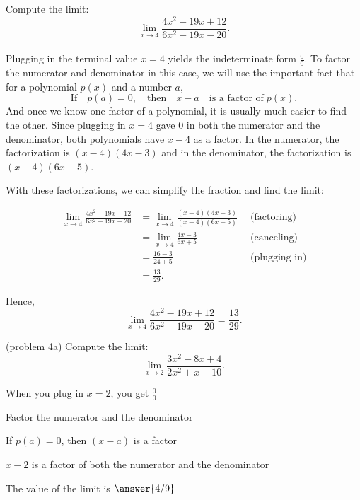 \documentclass[handout]{ximera}
\begin{document}
\begin{example}[example 4]
Compute the limit: \[\lim_{x \to 4} \frac{4x^2 - 19x + 12}{6x^2 -19x -20}.\]
\\
Plugging in the terminal value $x = 4$ yields the indeterminate form $\frac00$.
To factor the numerator and denominator in this case, we will use the important fact that
for a polynomial $p(x)$ and a number $a$, 
\[\text{If} \quad p(a) = 0, \quad \text{then} \quad  x-a \quad \text{is a factor of} \; p(x).\]
And once we know one factor of a polynomial, it is usually much easier to find the other.
Since plugging in $x=4$ gave $0$ in both the numerator and the denominator, both polynomials 
have $x-4$ as a factor.
In the numerator, the factorization is $(x-4)(4x-3)$ and in the denominator, 
the factorization is $(x-4)(6x+5)$.

With these factorizations, we can simplify the fraction and find the limit:

\begin{align*}
\lim_{x \to 4} \frac{4x^2 - 19x + 12}{6x^2 -19x -20} &= \lim_{x \to 4}\frac{(x-4)(4x-3)}{(x-4)(6x + 5)} 
\enspace & \text{(factoring)} \\[.4 em]
&= \lim_{x \to 4} \frac{4x-3}{6x + 5} & \text{(canceling)} \\[.4 em]
&= \frac{16-3}{24+5} & \text{(plugging in)}\\[.4 em]
&= \frac{13}{29}. 
\end{align*}

Hence,
\[\lim_{x \to 4} \frac{4x^2 -19x +12}{6x^2 -19x -20} = \frac{13}{29}.\]
\end{example}



\begin{problem}(problem 4a)
  Compute the limit:
  \[
  \lim_{x \to 2} \frac{3x^2 -8x + 4}{2x^2 + x - 10}.
  \]
  
    \begin{hint}
      When you plug in $x = 2$, you get $\frac00$
    \end{hint}
    \begin{hint}
      Factor the numerator and the denominator
    \end{hint}
    \begin{hint}
      If $p(a) = 0$, then $(x-a)$ is a factor
    \end{hint}
    \begin{hint}
      $x-2$ is a factor of both the numerator and the denominator
    \end{hint}
    
		The value of the limit is
		 $\answer{4/9}$
		
\end{problem}
\end{document}
